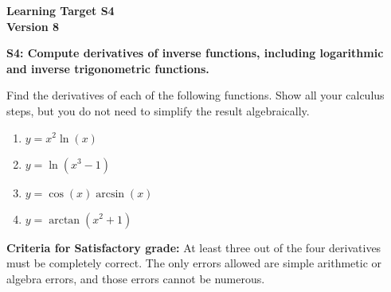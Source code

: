 \documentclass[10pt]{article}
\begin{document}
	\vspace*{0in}

		\begin{center}
			\textbf{Learning Target S4 \\
			Version 8} 
		\end{center}


\begin{framed}
	\textbf{S4: Compute derivatives of inverse functions, including logarithmic and inverse trigonometric functions.}
\end{framed}

Find the derivatives of each of the following functions. Show all your calculus steps, but you do not need to simplify the result algebraically. 

\begin{enumerate}
    \item $y = x^2 \ln(x)$
    \item $y = \ln (x^3 - 1)$
    \item $y = \cos(x) \arcsin(x)$
    \item $y = \arctan (x^2+1)$
\end{enumerate}

\vfill


\begin{small}
    \begin{framed}
        	\textbf{Criteria for Satisfactory grade:} At least three out of the four derivatives must be completely correct. The only errors allowed are simple arithmetic or algebra errors, and those errors cannot be numerous.
    \end{framed}

\end{small}
\end{document}

